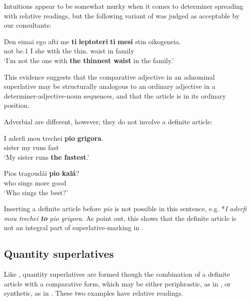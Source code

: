 \documentclass[output=paper
,modfonts
,nonflat]{langsci/langscibook}
\begin{document}
Intuitions appear to be somewhat murky when it comes to determiner spreading with relative readings, but the following variant of  was judged as acceptable  by our consultants:

\ea \label{ex:coppockstrand:11}
\gll Den eimai ego afti me \textbf{ti} \textbf{leptoteri} \textbf{ti} \textbf{mesi}  stin oikogeneia.\\
 not be.1\sg{} I she with the thin.\cmpr{}   waist  in family\\
 \glt `I'm not the one with \textbf{the thinnest waist} in the family.'
\z

This evidence suggests that the comparative adjective in an adnominal superlative may be structurally analogous to an ordinary adjective in a determiner-adjective-noun sequences, and that the article is in its ordinary position.

Adverbial  are different, however; they do not involve a definite article:

\ea{}
\gll I aderfi mou trechei \textbf{pio} \textbf{grigora}.\\
 sister my runs \cmpr{} fast\\
\glt `My sister runs \textbf{the fastest}.'
\z
 
\ea{}
\gll Pios tragoud\'ai \textbf{pio} \textbf{kal\'a}?\\
who sings more good\\
\glt `Who sings the best?' \citep[16, ex.\ 71]{Dobrovie-SorinGiurgea2015}\\
\z

Inserting a definite article before \textit{pio} is not possible in this sentence, e.g. *\textit{I aderfi mou trechei \textbf{to} pio grigora}. As \citet{Dobrovie-SorinGiurgea2015} point out, this shows that the definite article is not an integral part of superlative-marking in .

\subsection{Quantity superlatives}

Like , quantity superlatives are formed though the combination of a definite article with a comparative form, which may be either periphrastic, as in , or synthetic, as in . These two examples have relative readings.
\end{document}
